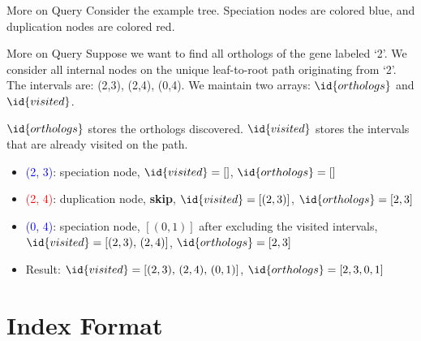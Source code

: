 \documentclass{beamer}
\begin{document}
\begin{frame}{More on Query}
    Consider the example tree. Speciation nodes are colored {\color{blue}blue}, and duplication nodes are colored {\color{red}red}.

\end{frame}

\begin{frame}{More on Query}
    Suppose we want to find all orthologs of the gene labeled `2'. We consider all internal nodes on the unique leaf-to-root path originating from `2'. The intervals are: (2,3), (2,4), (0,4). We maintain two arrays: $\id{orthologs}$ and $\id{visited}$.

    $\id{orthologs}$ stores the orthologs discovered. $\id{visited}$ stores the intervals that are already visited on the path.

    \begin{itemize}
        \item \textcolor{blue}{(2, 3)}: speciation node, $\id{visited} = []$, $\id{orthologs} = []$
        \item \textcolor{red}{(2, 4)}: duplication node, \textbf{skip}, $\id{visited} = [(2,3)]$, $\id{orthologs} = [2,3]$
        \item \textcolor{blue}{(0, 4)}: speciation node, $[(0,1)]$ after excluding the visited intervals, $\id{visited} = [(2,3),\, (2,4)]$, $\id{orthologs} = [2,3]$
        \item Result: $\id{visited} = [(2,3),\,(2,4),\,(0,1)]$, $\id{orthologs} = [2,3,0,1]$
    \end{itemize}
\end{frame}

\section{Index Format}
\end{document}
